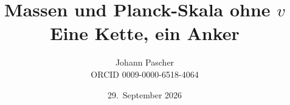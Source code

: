 \documentclass[11pt,a4paper]{report}
\title{Massen und Planck-Skala ohne $v$\\[0.5em]
  \large Eine Kette, ein Anker}
\date{29.~September 2026}
\author{Johann Pascher\\\small ORCID 0009-0000-6518-4064}
\begin{document}
\renewcommand{\thechapter}{}
\renewcommand{\thesection}{\arabic{section}}
\maketitle
\tableofcontents

\end{document}
